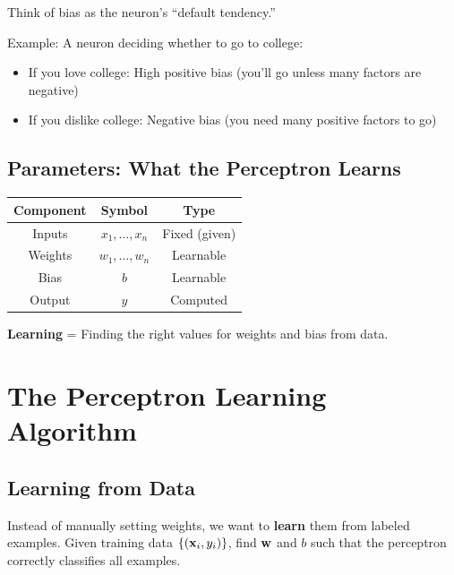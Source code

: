 \begin{bluebox}
Think of bias as the neuron's ``default tendency.'' 

Example: A neuron deciding whether to go to college:
\begin{itemize}
    \item If you love college: High positive bias (you'll go unless many factors are negative)
    \item If you dislike college: Negative bias (you need many positive factors to go)
\end{itemize}
\end{bluebox}

\subsection{Parameters: What the Perceptron Learns}

\begin{center}
\begin{tabular}{|c|c|c|}
\hline
\textbf{Component} & \textbf{Symbol} & \textbf{Type} \\ \hline
Inputs & $x_1, \ldots, x_n$ & Fixed (given) \\ \hline
Weights & $w_1, \ldots, w_n$ & Learnable \\ \hline
Bias & $b$ & Learnable \\ \hline
Output & $y$ & Computed \\ \hline
\end{tabular}
\end{center}

\textbf{Learning} = Finding the right values for weights and bias from data.


\section{The Perceptron Learning Algorithm}

\subsection{Learning from Data}

Instead of manually setting weights, we want to \textbf{learn} them from labeled examples. Given training data $\{(\mathbf{x}_i, y_i)\}$, find $\mathbf{w}$ and $b$ such that the perceptron correctly classifies all examples.

